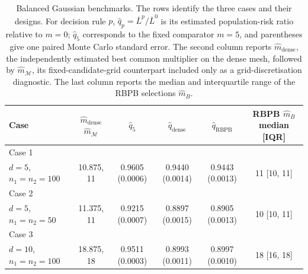 \begin{table}[ht]
\centering
\footnotesize
\setlength{\tabcolsep}{4pt}
\begin{tabular}{@{}lccccc@{}}
\toprule
Case & \shortstack{$\widehat m_{\mathrm{dense}}$\\$\widehat m_{\mathcal M}$} & $\widehat q_{5}$ & $\widehat q_{\mathrm{dense}}$ & $\widehat q_{\mathrm{RBPB}}$ & \shortstack{RBPB $\widehat m_B$\\median [IQR]} \\
\midrule
Case 1 & & & & & \\
$d=5$, $n_1=n_2=100$ & 10.875, 11 & 0.9605 (0.0006) & 0.9440 (0.0014) & 0.9443 (0.0013) & 11 [10, 11] \\
Case 2 & & & & & \\
$d=5$, $n_1=n_2=50$ & 11.375, 11 & 0.9215 (0.0007) & 0.8897 (0.0015) & 0.8905 (0.0013) & 10 [10, 11] \\
Case 3 & & & & & \\
$d=10$, $n_1=n_2=100$ & 18.875, 18 & 0.9511 (0.0003) & 0.8993 (0.0011) & 0.8997 (0.0010) & 18 [16, 18] \\
\bottomrule
\end{tabular}
\caption{Balanced Gaussian benchmarks. The rows identify the three cases and
their designs. For decision rule $p$,
$\widehat q_p=\overline L^p/\overline L^0$ is its estimated population-risk
ratio relative to $m=0$; $\widehat q_5$ corresponds to the fixed comparator
$m=5$, and parentheses give one paired Monte Carlo standard error. The second
column reports $\widehat m_{\mathrm{dense}}$, the independently estimated best
common multiplier on the dense mesh, followed by $\widehat m_{\mathcal M}$,
its fixed-candidate-grid counterpart included only as a grid-discretisation
diagnostic. The last column reports the median and interquartile range of the
RBPB selections $\widehat m_B$.}
\label{tab:rbpb-gaussian-benchmark}
\end{table}

